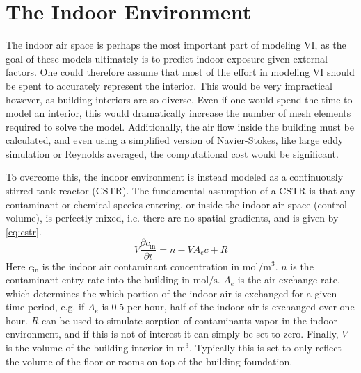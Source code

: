 
\section{The Indoor Environment}\label{sec:indoor}

The indoor air space is perhaps the most important part of modeling VI, as the goal of these models ultimately is to predict indoor exposure given external factors.
One could therefore assume that most of the effort in modeling VI should be spent to accurately represent the interior.
This would be very impractical however, as building interiors are so diverse.
Even if one would spend the time to model an interior, this would dramatically increase the number of mesh elements required to solve the model.
Additionally, the air flow inside the building must be calculated, and even using a simplified version of Navier-Stokes, like large eddy simulation or Reynolds averaged, the computational cost would be significant.\par

To overcome this, the indoor environment is instead modeled as a continuously stirred tank reactor (CSTR).
The fundamental assumption of a CSTR is that any contaminant or chemical species entering, or inside the indoor air space (control volume), is perfectly mixed, i.e. there are no spatial gradients, and is given by \eqref{eq:cstr}.
\begin{equation}\label{eq:cstr}
  V\frac{\partial c_\mathrm{in}}{\partial t} = n - V A_e c + R
\end{equation}
Here $c_\mathrm{in}$ is the indoor air contaminant concentration in $\mathrm{mol/m^3}$.
$n$ is the contaminant entry rate into the building in $\mathrm{mol/s}$.
$A_e$ is the air exchange rate, which determines the which portion of the indoor air is exchanged for a given time period, e.g. if $A_e$ is 0.5 per hour, half of the indoor air is exchanged over one hour.
$R$ can be used to simulate sorption of contaminants vapor in the indoor environment, and if this is not of interest it can simply be set to zero.
Finally, $V$ is the volume of the building interior in $\mathrm{m^3}$.
Typically this is set to only reflect the volume of the floor or rooms on top of the building foundation.\par


